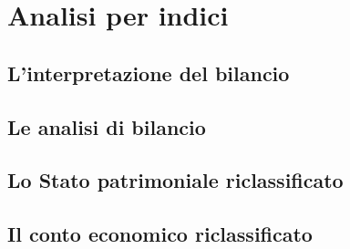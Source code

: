 \documentclass{report}
\begin{document}
\newpage
\section{Analisi per indici} %
\label{sec:Analisi per indici}

\subsection{L'interpretazione del bilancio} %
\label{sub:L'interpretazione del bilancio}


\subsection{Le analisi di bilancio} %
\label{sub:Le analisi di bilancio}


\subsection{Lo Stato patrimoniale riclassificato} %
\label{sub:Lo Stato patrimoniale riclassificato}


\subsection{Il conto economico riclassificato} %
\label{sub:Il conto economico riclassificato}



\end{document}
